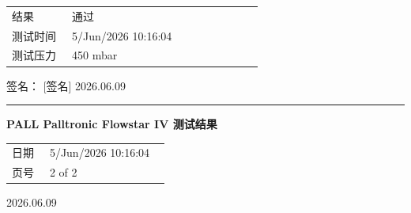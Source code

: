 \documentclass[UTF8,10pt,a4paper,fontset=fandol]{ctexart}
\newcommand{\fieldvalue}[1]{#1}
\newcommand{\handwritten}[1]{#1}
\begin{document}
\vspace{1em}

\begin{tabular}{@{}p{0.22\linewidth}p{0.70\linewidth}@{}}
结果 &
\fieldvalue{通过}
\\
测试时间 &
\fieldvalue{5/Jun/2026 10:16:04}
\\
测试压力 &
\fieldvalue{450 mbar}
\end{tabular}

\vspace{1em}

签名：%
\fieldvalue{\handwritten{[签名] 2026.06.09}}

\vspace{2em}
\hrule
\vspace{1em}

\begin{center}
\textbf{PALL Palltronic Flowstar IV 测试结果}
\end{center}

\begin{tabular}{@{}p{0.22\linewidth}p{0.70\linewidth}@{}}
日期 &
\fieldvalue{5/Jun/2026 10:16:04}
\\
页号 &
\fieldvalue{2 of 2}
\end{tabular}

\vspace{1em}

\begin{center}
\end{center}

\vspace{1em}

\handwritten{2026.06.09}

\vspace{1em}
\end{document}
